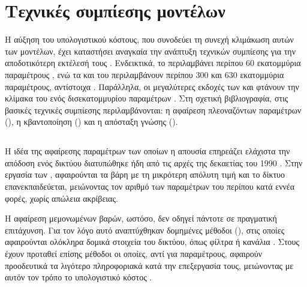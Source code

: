 \section{Τεχνικές συμπίεσης μοντέλων}
\label{sec:related-efficient-vision-models}

Η αύξηση του υπολογιστικού κόστους, που συνοδεύει τη συνεχή κλιμάκωση
αυτών των μοντέλων, έχει καταστήσει αναγκαία την ανάπτυξη τεχνικών
συμπίεσης για την αποδοτικότερη εκτέλεσή τους \cite{li2023modelcompression}. Ενδεικτικά, το  περιλαμβάνει περίπου 60 εκατομμύρια
παραμέτρους \cite{krizhevsky2012imagenet}, ενώ τα  και
 του  περιλαμβάνουν περίπου 300 και
630 εκατομμύρια παραμέτρους, αντίστοιχα
\cite{adrien2023v-jepa}. Παράλληλα, οι μεγαλύτερες εκδοχές των  και
 φτάνουν την κλίμακα του ενός δισεκατομμυρίου παραμέτρων
\cite{wang2023videomaev2,assran2025vjepa2}. Στη σχετική βιβλιογραφία, 
στις βασικές τεχνικές συμπίεσης περιλαμβάνονται: η αφαίρεση πλεοναζόντων παραμέτρων (), η κβαντοποίηση
() και η απόσταξη γνώσης
()\cite{li2023modelcompression}. 

\subsection{}
\label{subsec:pruning}

Η ιδέα της αφαίρεσης παραμέτρων των οποίων η απουσία επηρεάζει ελάχιστα
την απόδοση ενός δικτύου διατυπώθηκε ήδη από τις αρχές της δεκαετίας του
1990 \cite{lecun1990optimal}. Στην εργασία των 
\cite{han2015learning}, αφαιρούνται τα βάρη με τη μικρότερη απόλυτη τιμή
και το δίκτυο επανεκπαιδεύεται, μειώνοντας τον αριθμό των παραμέτρων του
 περίπου κατά εννέα φορές, χωρίς απώλεια ακρίβειας.

Η αφαίρεση μεμονωμένων βαρών, ωστόσο, δεν οδηγεί πάντοτε σε πραγματική
επιτάχυνση. Για τον λόγο αυτό αναπτύχθηκαν δομημένες μέθοδοι
(), στις οποίες αφαιρούνται ολόκληρα δομικά
στοιχεία του δικτύου, όπως φίλτρα ή κανάλια \cite{li2017pruning}. Στους
 έχουν προταθεί επίσης μέθοδοι οι οποίες, αντί
για παραμέτρους, αφαιρούν προοδευτικά τα λιγότερο πληροφοριακά
 κατά την επεξεργασία τους, μειώνοντας με αυτόν τον τρόπο το
υπολογιστικό κόστος \cite{rao2021dynamicvit}.

\subsection{}
\label{subsec:related-quantization}

